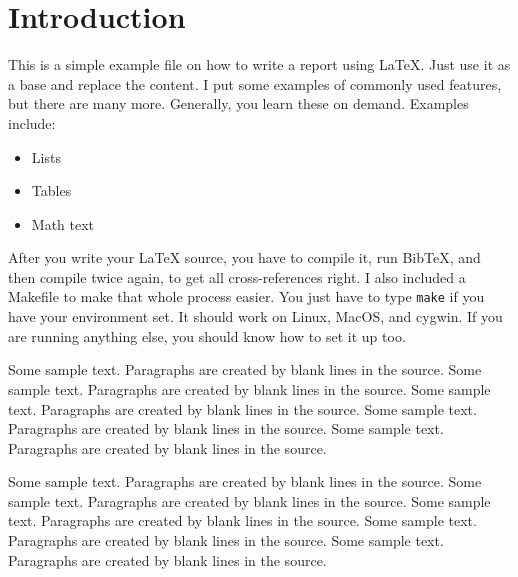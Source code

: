 \section{Introduction}
\label{sec:intro}
This is a simple example file on how to write a report using LaTeX.
Just use it as a base and replace the content. I put some examples of
commonly used features, but there are many more. Generally, you learn
these on demand. Examples include:

\begin{itemize}
\item Lists
\item Tables
\item Math text
\end{itemize}

After you write your LaTeX source, you have to compile it, run
BibTeX, and then compile twice again, to get all cross-references 
right. I also included a Makefile to make that whole process easier.
You just have to type \texttt{make} if you have your environment set.
It should work on Linux, MacOS, and cygwin. If you are running 
anything else, you should know how to set it up too.

Some sample text. Paragraphs are created by blank lines in the source.
Some sample text. Paragraphs are created by blank lines in the source.
Some sample text. Paragraphs are created by blank lines in the source.
Some sample text. Paragraphs are created by blank lines in the source.
Some sample text. Paragraphs are created by blank lines in the source.

Some sample text. Paragraphs are created by blank lines in the source.
Some sample text. Paragraphs are created by blank lines in the source.
Some sample text. Paragraphs are created by blank lines in the source.
Some sample text. Paragraphs are created by blank lines in the source.
Some sample text. Paragraphs are created by blank lines in the source.
